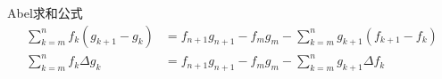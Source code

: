 \begin{theorem}{Abel求和公式}
    \begin{align*}
        \sum_{k=m}^{n} f_{k} (g_{k+1} - g_{k}) &=
        f_{n+1}g_{n+1} - f_{m}g_{m} - \sum_{k=m}^{n}
        g_{k+1}(f_{k+1} -f_{k}) \\
        \sum_{k=m}^{n} f_{k}\Delta g_{k} &= f_{n+1}g_{n+1}
        - f_{m}g_{m} - \sum_{k=m}^{n} g_{k+1}\Delta f_{k}
    \end{align*}
\end{theorem}

